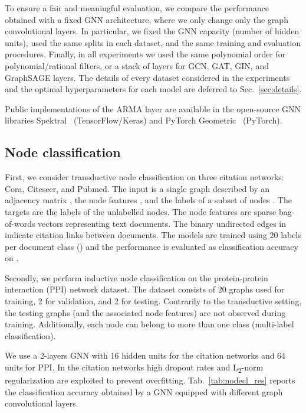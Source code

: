 \documentclass{article}
\begin{document}
To ensure a fair and meaningful evaluation, we compare the performance obtained with a fixed GNN architecture, where we only change only the graph convolutional layers.
In particular, we fixed the GNN capacity (number of hidden units), used the same splits in each dataset, and the same training and evaluation procedures.
Finally, in all experiments we used the same polynomial order  for polynomial/rational filters, or a stack of  layers for GCN, GAT, GIN, and GraphSAGE layers.
The details of every dataset considered in the experiments and the optimal hyperparameters for each model are deferred to Sec.~\ref{sec:details}.

Public implementations of the ARMA layer are available in the open-source GNN libraries Spektral~\cite{grattarola2020graph} (TensorFlow/Keras) and PyTorch Geometric~\cite{fey2019fast} (PyTorch).

\subsection{Node classification}
First, we consider transductive node classification on three citation networks: Cora, Citeseer, and Pubmed. 
The input is a single graph described by an adjacency matrix , the node features , and the labels  of a subset of nodes . 
The targets are the labels  of the unlabelled nodes.
The node features are sparse bag-of-words vectors representing text documents. 
The binary undirected edges in  indicate citation links between documents.
The models are trained using 20 labels per document class () and the performance is evaluated as classification accuracy on .

Secondly, we perform inductive node classification on the protein-protein interaction (PPI) network dataset.
The dataset consists of 20 graphs used for training, 2 for validation, and 2 for testing. 
Contrarily to the transductive setting, the testing graphs (and the associated node features) are not observed during training. 
Additionally, each node can belong to more than one class (multi-label classification).

We use a 2-layers GNN with 16 hidden units for the citation networks and 64 units for PPI. 
In the citation networks high dropout rates and L\textsubscript{2}-norm regularization are exploited to prevent overfitting. 
Tab.~\ref{tab:nodecl_res} reports the classification accuracy obtained by a GNN equipped with different graph convolutional layers.
\end{document}
